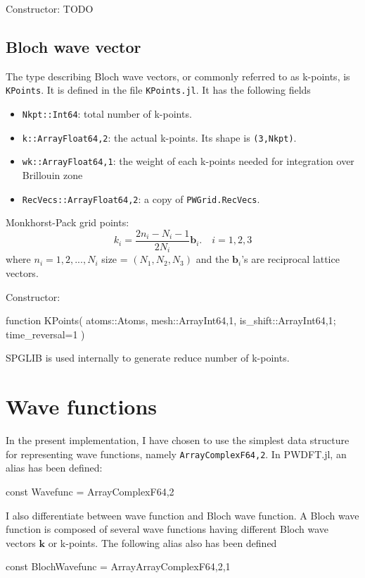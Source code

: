 \documentclass[a4paper,10pt]{paper}
\newcommand{\jlcode}[1]{\texttt{#1}}
\begin{document}
Constructor: TODO

\subsection{Bloch wave vector}

The type describing Bloch wave vectors, or commonly referred
to as k-points, is \jlcode{KPoints}. It is defined in the file
\jlcode{KPoints.jl}. It has the following fields
%
\begin{itemize}
%
\item \jlcode{Nkpt::Int64}: total number of k-points.
%
\item \jlcode{k::Array{Float64,2}}: the actual k-points.
  Its shape is \jlcode{(3,Nkpt)}.
%
\item \jlcode{wk::Array{Float64,1}}: the weight of each k-points needed
  for integration over Brillouin zone
%
\item \jlcode{RecVecs::Array{Float64,2}}: a copy of \jlcode{PWGrid.RecVecs}.
\end{itemize}

Monkhorst-Pack grid points:
%
\begin{equation}
k_{i} = \frac{2n_i -N_i - 1}{2N_i} \mathbf{b}_i.\hspace{1em}
i = 1,2,3
\end{equation}
%
where $n_i=1,2,...,N_{i}$
size = \((N_1, N_2, N_3)\) and the \(\mathbf{b}_i\)'s are reciprocal lattice vectors.


Constructor:

\begin{juliacode}
function KPoints( atoms::Atoms, mesh::Array{Int64,1}, is_shift::Array{Int64,1};
                  time_reversal=1 )
\end{juliacode}

SPGLIB is used internally to generate reduce number of k-points.


\section{Wave functions}

In the present implementation, I have chosen to use the simplest
data structure for representing wave functions, namely
\jlcode{Array{ComplexF64,2}}. In \textsf{PWDFT.jl}, an alias
has been defined:
\begin{juliacode}
const Wavefunc = Array{ComplexF64,2}
\end{juliacode}

I also differentiate between wave function and Bloch wave function.
A Bloch wave function is composed of several wave functions having
different Bloch wave vectors $\mathbf{k}$ or k-points.
The following alias also has been defined
\begin{juliacode}
const BlochWavefunc = Array{Array{ComplexF64,2},1}
\end{juliacode}
\end{document}
